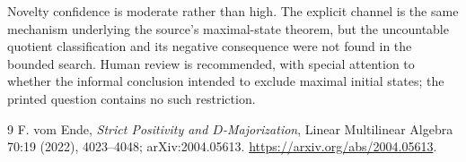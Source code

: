 \documentclass[11pt]{article}
\begin{document}
Novelty confidence is moderate rather than high.  The explicit channel is the
same mechanism underlying the source's maximal-state theorem, but the
uncountable quotient classification and its negative consequence were not
found in the bounded search.  Human review is recommended, with special
attention to whether the informal conclusion intended to exclude maximal
initial states; the printed question contains no such restriction.

\begin{thebibliography}{9}
F. vom Ende,
\emph{Strict Positivity and \(D\)-Majorization},
Linear Multilinear Algebra 70:19 (2022), 4023--4048;
arXiv:2004.05613.
\url{https://arxiv.org/abs/2004.05613}.
\end{thebibliography}
\end{document}
